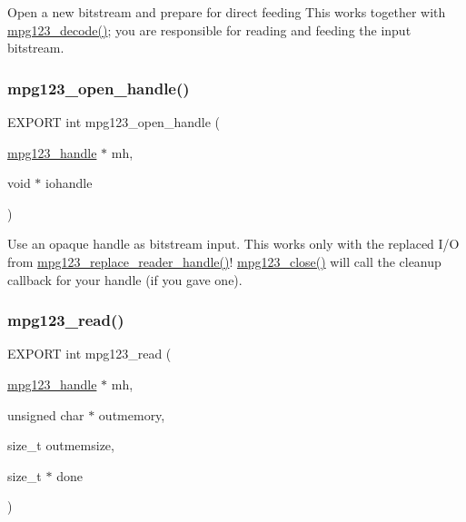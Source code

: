 Open a new bitstream and prepare for direct feeding This works together with \hyperlink{group__mpg123__input_gad35309fe0892d534b6430e3bfde68358}{mpg123\+\_\+decode()}; you are responsible for reading and feeding the input bitstream. \mbox{\label{group__mpg123__input_gad6637826d5288242db3eef0ba6c421ba}} 
\subsubsection{\texorpdfstring{mpg123\+\_\+open\+\_\+handle()}{mpg123\_open\_handle()}}
{\footnotesize\ttfamily E\+X\+P\+O\+RT int mpg123\+\_\+open\+\_\+handle (\begin{DoxyParamCaption}\item[{\hyperlink{group__mpg123__init_ga6728e2839a395f3a07d4514da659faca}{mpg123\+\_\+handle} $\ast$}]{mh,  }\item[{void $\ast$}]{iohandle }\end{DoxyParamCaption})}

Use an opaque handle as bitstream input. This works only with the replaced I/O from \hyperlink{group__mpg123__lowio_gacce158687fce659acb242952b0a30916}{mpg123\+\_\+replace\+\_\+reader\+\_\+handle()}! \hyperlink{group__mpg123__input_ga1c86c6042807ab7734b67a829ee7a2e7}{mpg123\+\_\+close()} will call the cleanup callback for your handle (if you gave one). \mbox{\label{group__mpg123__input_ga5948710fab983a1c0e0464683207c70c}} 
\subsubsection{\texorpdfstring{mpg123\+\_\+read()}{mpg123\_read()}}
{\footnotesize\ttfamily E\+X\+P\+O\+RT int mpg123\+\_\+read (\begin{DoxyParamCaption}\item[{\hyperlink{group__mpg123__init_ga6728e2839a395f3a07d4514da659faca}{mpg123\+\_\+handle} $\ast$}]{mh,  }\item[{unsigned char $\ast$}]{outmemory,  }\item[{size\+\_\+t}]{outmemsize,  }\item[{size\+\_\+t $\ast$}]{done }\end{DoxyParamCaption})}


